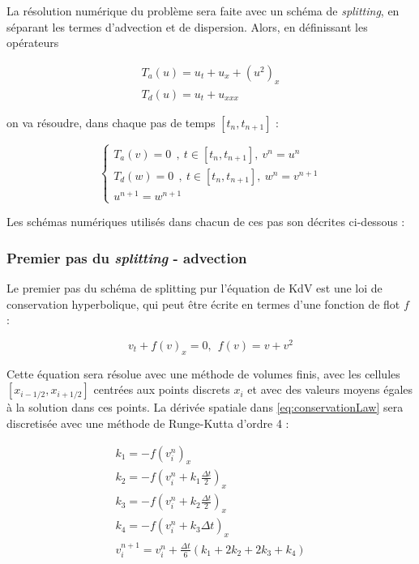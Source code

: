 \indent La résolution numérique du problème sera faite avec un schéma de \emph{splitting}, en séparant les termes d'advection et de dispersion. Alors, en définissant les opérateurs

\begin{gather*}
	T_a(u) = u_t + u_x + (u^2)_x \\
	T_d(u) = u_t + u_{xxx}
\end{gather*}

 \noindent on va résoudre, dans chaque pas de temps $[t_n,t_{n+1}]$ :
 
\begin{equation*}
\begin{cases}
   T_a(v) = 0 \ \ ,\ t \in [t_n,t_{n+1}], \  v^n = u^n \\
   T_d(w) = 0 \ \ , \ t \in [t_n,t_{n+1}], \  w^n = v^{n+1} \\
    u^{n+1} = w^{n+1}
\end{cases}
\end{equation*}

\indent Les schémas numériques utilisés dans chacun de ces pas son décrites ci-dessous :

\subsubsection{Premier pas du \emph{splitting} - advection}
\label{sec:KdVSplitted1}

\indent Le premier pas du schéma de splitting pur l'équation de KdV est une loi de conservation hyperbolique, qui peut être écrite en termes d'une fonction de flot $f$ :

\begin{equation}
  \label{eq:conservationLaw}
	v_t + f(v)_x = 0, \ \ f(v) = v + v^2
\end{equation}

\indent Cette équation sera résolue avec une méthode de volumes finis, avec les cellules $[x_{i-1/2}, x_{i+1/2}]$ centrées aux points discrets $x_i$ et avec des valeurs moyens égales à la solution dans ces points. La dérivée spatiale dans \eqref{eq:conservationLaw} sera discretisée avec une méthode de Runge-Kutta d'ordre 4 :

\begin{equation*}
\begin{gathered}
k_1 = - f(v_i^n)_x \\
k_2 = - f\left(v_i^n + k_1\frac{\Delta t }{2}\right)_x \\
k_3 = - f\left(v_i^n + k_2\frac{\Delta t }{2}\right)_x \\
k_4 = - f(v_i^n + k_3 \Delta t)_x \\
v_i^{n+1} = v_i^n + \frac{\Delta t}{6}(k_1 + 2k_2 + 2k_3 + k_4)
\end{gathered}
\end{equation*}

